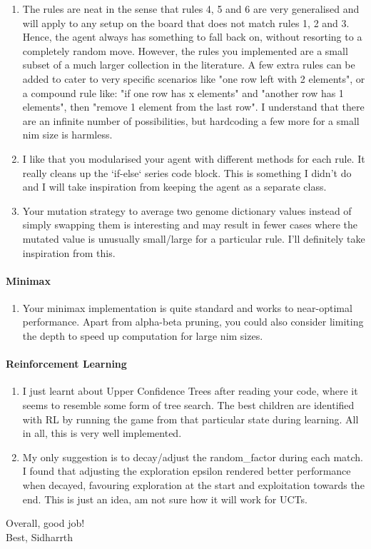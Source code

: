 \begin{enumerate}
    \item The rules are neat in the sense that rules 4, 5 and 6 are very generalised and will apply to any setup on the board that does not match rules 1, 2 and 3. Hence, the agent always has something to fall back on, without resorting to a completely random move. However, the rules you implemented are a small subset of a much larger collection in the literature. A few extra rules can be added to cater to very specific scenarios like "one row left with 2 elements", or a compound rule like: "if one row has x elements" and "another row has 1 elements", then "remove 1 element from the last row". I understand that there are an infinite number of possibilities, but hardcoding a few more for a small nim size is harmless.
    \item I like that you modularised your agent with different methods for each rule. It really cleans up the `if-else` series code block. This is something I didn't do and I will take inspiration from keeping the agent as a separate class.
    \item Your mutation strategy to average two genome dictionary values instead of simply swapping them is interesting and may result in fewer cases where the mutated value is unusually small/large for a particular rule. I'll definitely take inspiration from this.
\end{enumerate}

\paragraph{Minimax}

\begin{enumerate}
    \item Your minimax implementation is quite standard and works to near-optimal performance. Apart from alpha-beta pruning, you could also consider limiting the depth to speed up computation for large nim sizes.
\end{enumerate}

\paragraph{Reinforcement Learning}

\begin{enumerate}
    \item I just learnt about Upper Confidence Trees after reading your code, where it seems to resemble some form of tree search. The best children are identified with RL by running the game from that particular state during learning. All in all, this is very well implemented.
    \item My only suggestion is to decay/adjust the random\_factor during each match. I found that adjusting the exploration epsilon rendered better performance when decayed, favouring exploration at the start and exploitation towards the end. This is just an idea, am not sure how it will work for UCTs.
\end{enumerate}

Overall, good job! \\

Best,
Sidharrth